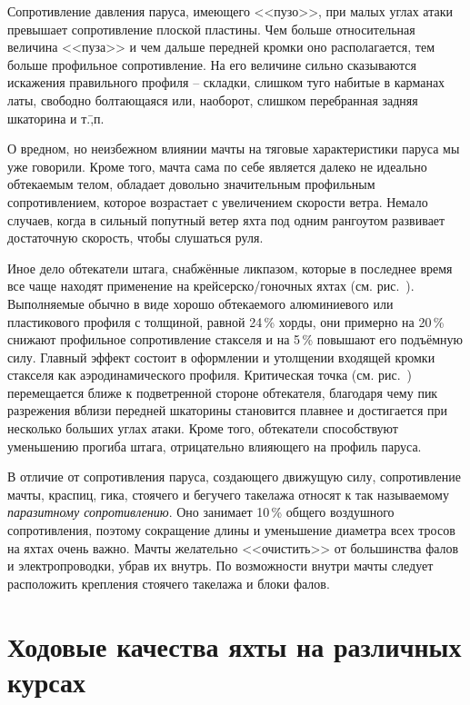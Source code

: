 Сопротивление давления паруса, имеющего <<пузо>>, при малых углах
атаки превышает сопротивление плоской пластины. Чем больше
относительная величина <<пуза>> и чем дальше передней кромки оно
располагается, тем больше профильное сопротивление. На его величине
сильно сказываются искажения правильного профиля \--- складки, слишком
туго набитые в карманах латы, свободно болтающаяся или, наоборот,
слишком перебранная задняя шкаторина и т.\=,п.
 
О вредном, но неизбежном влиянии мачты на тяговые характеристики
паруса мы уже говорили. Кроме того, мачта сама по себе является далеко
не идеально обтекаемым телом, обладает довольно значительным
профильным сопротивлением, которое возрастает с увеличением скорости
ветра. Немало случаев, когда в сильный попутный ветер яхта под одним
рангоутом развивает достаточную скорость, чтобы слушаться руля.

Иное дело обтекатели штага, снабжённые ликпазом, которые в последнее
время все чаще находят применение на крейсерско\-/гоночных яхтах
(см. рис.~). Выполняемые обычно в виде хорошо обтекаемого
алюминиевого или пластикового профиля с толщиной, равной 24\,\% хорды, они примерно на 20\,\% снижают профильное сопротивление
стакселя и на 5\,\% повышают его подъёмную силу. Главный эффект
состоит в оформлении и утолщении входящей кромки стакселя как
аэродинамического профиля. Критическая точка (см. рис.~)
перемещается ближе к подветренной стороне обтекателя, благодаря чему
пик разрежения вблизи передней шкаторины становится плавнее и
достигается при несколько больших углах атаки. Кроме того, обтекатели
способствуют уменьшению прогиба штага, отрицательно влияющего на
профиль паруса.

В отличие от сопротивления паруса, создающего движущую силу,
сопротивление мачты, краспиц, гика, стоячего и бегучего такелажа
относят к так называемому \textit{паразитному
сопротивлению}. Оно занимает 10\,\% общего воздушного сопротивления, поэтому сокращение длины и
уменьшение диаметра всех тросов на яхтах очень важно. Мачты желательно
<<очистить>> от большинства фалов и электропроводки, убрав их
внутрь. По возможности внутри мачты следует расположить крепления
стоячего такелажа и блоки фалов.

\section{Ходовые качества яхты на различных курсах}

